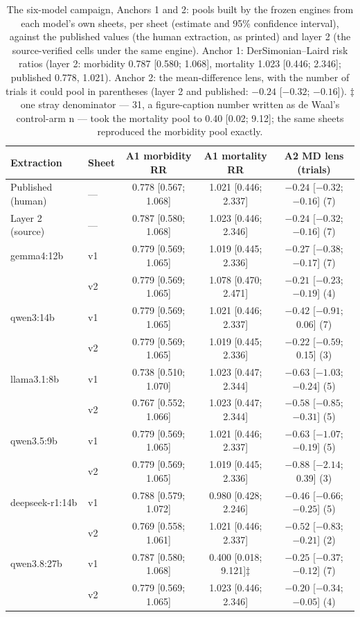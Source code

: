 \documentclass[11pt]{article}
\begin{document}
\begin{table}[H]
\centering\footnotesize
\caption{The six-model campaign, Anchors 1 and 2: pools built by the frozen engines from each model's own sheets, per sheet (estimate and 95\% confidence interval), against the published values (the human extraction, as printed) and layer 2 (the source-verified cells under the same engine). Anchor 1: DerSimonian--Laird risk ratios (layer 2: morbidity 0.787 [0.580; 1.068], mortality 1.023 [0.446; 2.346]; published 0.778, 1.021). Anchor 2: the mean-difference lens, with the number of trials it could pool in parentheses (layer 2 and published: $-0.24$ [$-0.32$; $-0.16$]). $\ddagger$one stray denominator --- 31, a figure-caption number written as de Waal's control-arm n --- took the mortality pool to 0.40 [0.02; 9.12]; the same sheets reproduced the morbidity pool exactly.}
\label{tab:s12pools}
\setlength{\tabcolsep}{2.5pt}
\begin{tabular}{llccc}
\toprule
Extraction & Sheet & A1 morbidity RR & A1 mortality RR & A2 MD lens (trials) \\
\midrule
Published (human) & --- & 0.778 [0.567; 1.068] & 1.021 [0.446; 2.337] & $-0.24$ [$-0.32$; $-0.16$] (7) \\
Layer 2 (source) & --- & 0.787 [0.580; 1.068] & 1.023 [0.446; 2.346] & $-0.24$ [$-0.32$; $-0.16$] (7) \\
\midrule
gemma4:12b & v1 & 0.779 [0.569; 1.065] & 1.019 [0.445; 2.336] & $-0.27$ [$-0.38$; $-0.17$] (7) \\
 & v2 & 0.779 [0.569; 1.065] & 1.078 [0.470; 2.471] & $-0.21$ [$-0.23$; $-0.19$] (4) \\
qwen3:14b & v1 & 0.779 [0.569; 1.065] & 1.021 [0.446; 2.337] & $-0.42$ [$-0.91$; 0.06] (7) \\
 & v2 & 0.779 [0.569; 1.065] & 1.019 [0.445; 2.336] & $-0.22$ [$-0.59$; 0.15] (3) \\
llama3.1:8b & v1 & 0.738 [0.510; 1.070] & 1.023 [0.447; 2.344] & $-0.63$ [$-1.03$; $-0.24$] (5) \\
 & v2 & 0.767 [0.552; 1.066] & 1.023 [0.447; 2.344] & $-0.58$ [$-0.85$; $-0.31$] (5) \\
qwen3.5:9b & v1 & 0.779 [0.569; 1.065] & 1.021 [0.446; 2.337] & $-0.63$ [$-1.07$; $-0.19$] (5) \\
 & v2 & 0.779 [0.569; 1.065] & 1.019 [0.445; 2.336] & $-0.88$ [$-2.14$; 0.39] (3) \\
deepseek-r1:14b & v1 & 0.788 [0.579; 1.072] & 0.980 [0.428; 2.246] & $-0.46$ [$-0.66$; $-0.25$] (5) \\
 & v2 & 0.769 [0.558; 1.061] & 1.021 [0.446; 2.337] & $-0.52$ [$-0.83$; $-0.21$] (2) \\
qwen3.8:27b & v1 & 0.787 [0.580; 1.068] & 0.400 [0.018; 9.121]$\ddagger$ & $-0.25$ [$-0.37$; $-0.12$] (7) \\
 & v2 & 0.779 [0.569; 1.065] & 1.023 [0.446; 2.346] & $-0.20$ [$-0.34$; $-0.05$] (4) \\
\bottomrule
\end{tabular}
\end{table}
\end{document}
